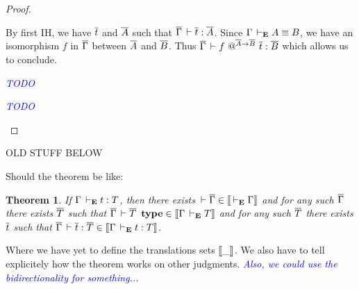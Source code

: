 \documentclass{amsart}
\newcommand\meta[1]{\noindent\textcolor{blue}{\emph{#1}}}
\newtheorem{theorem}{Theorem}[section]
\begin{document}
\begin{proof}
\begin{caselist}
    By first IH, we have $\overline{t}$ and $\overline{A}$ such that
    $\overline{\Gamma} \,\vdash \overline{t} : \overline{A}$. Since $\Gamma \,\vdash_\mathbf{E} A \equiv B$, we have
    an isomorphism $f$ in $\overline{\Gamma}$ between $\overline{A}$ and $\overline{B}$.
    Thus $\overline{\Gamma} \,\vdash f\ @^{\overline{A} \to \overline{B}}\ \overline{t} : \overline{B}$ which allows us
    to conclude.

    \nextcase
    \begin{mathc}
    \end{mathc}
    \meta{TODO}

    \nextcase
    \begin{mathc}
    \end{mathc}
    \meta{TODO}
  \end{caselist}
\end{proof}

\newpage
\hrulefill
OLD STUFF BELOW

Should the theorem be like:

\begin{theorem}
  If $\Gamma \,\vdash_\mathbf{E} t : T$, then there exists
  $\,\vdash \overline{\Gamma} \in \mathopen{{[\kern-0.14em[}} \,\vdash_\mathbf{E} \Gamma \mathclose{{]\kern-0.14em]}}$ and for any such $\overline{\Gamma}$ there exists
  $\overline{T}$ such that $\overline{\Gamma} \,\vdash \overline{T}\ \operatorname{\mathbf{type}} \in \mathopen{{[\kern-0.14em[}} \Gamma \,\vdash_\mathbf{E} T \mathclose{{]\kern-0.14em]}}$
  and for any such $\overline{T}$ there exists $\overline{t}$ such that
  $\overline{\Gamma} \,\vdash \overline{t} : \overline{T} \in \mathopen{{[\kern-0.14em[}} \Gamma \,\vdash_\mathbf{E} t : T \mathclose{{]\kern-0.14em]}}$.
\end{theorem}
%
Where we have yet to define the translations sets $\mathopen{{[\kern-0.14em[}} \_ \mathclose{{]\kern-0.14em]}}$.
We also have to tell explicitely how the theorem works on other judgments.
\meta{Also, we could use the bidirectionality for something...}
\end{document}
